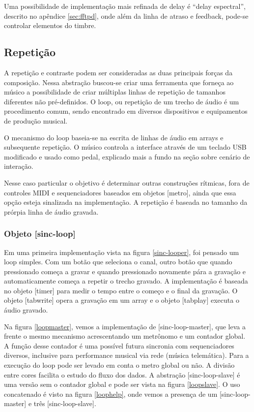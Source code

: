 \documentclass{ppgmus}
\begin{document}
Uma possibilidade de implementação mais refinada de delay é ``delay espectral'', descrito
no apêndice \ref{sec:fftpd}, onde além da linha de atraso e feedback, pode-se controlar elementos
do timbre.

\subsection{Repetição}


A repetição e contraste podem ser consideradas as duas principais forças
da composição. Nessa abstração buscou-se criar uma ferramenta que forneça ao músico 
a possibilidade de criar múltiplas linhas de repetição de tamanhos diferentes não pré-definidos.
O loop, ou repetição de um trecho de áudio é um procedimento comum,
sendo encontrado em diversos dispositivos e equipamentos de produção musical.


O mecanismo do loop baseia-se na escrita de linhas de áudio em arrays e subsequente
repetição. O músico controla a interface através de um teclado USB modificado e 
usado como pedal, explicado mais a fundo na seção sobre cenário de interação.

Nesse caso particular o objetivo é determinar outras construções rítmicas,
fora de controles MIDI e sequenciadores baseados em objetos [metro], ainda que essa opção
esteja sinalizada na implementação. A repetição
é baseada no tamanho da prórpia linha de áudio gravada.


\subsubsection{Objeto [sinc-loop]}


Em uma primeira implementação  vista na figura \ref{sinc-looper}, foi pensado um loop simples. Com um botão
que seleciona o canal, outro botão que quando pressionado começa 
a gravar e quando pressionado novamente pára a gravação e automaticamente
começa a repetir o trecho gravado. A implementação é baseada no objeto
[timer] para medir o tempo entre o começo e o final da gravação. O objeto
[tabwrite\texttildelow] opera a gravação em um array e o objeto [tabplay\texttildelow]
executa o áudio gravado.

Na figura \ref{loopmaster}, vemos a implementação de [sinc-loop-master], que leva a frente
o mesmo mecanismo acrescentando um metrônomo e um contador global. A função desse contador
é uma possível futura sincronia com sequenciadores diversos, inclusive para performance
musical via rede (música telemática). Para a execução do loop pode ser levado em conta
o metro global ou não. A divisão entre cores facilita o estudo do fluxo dos dados.
A abstração [sinc-loop-slave] é uma versão sem o contador global e pode ser vista
na figura \ref{loopslave}. O uso concatenado é visto na figura \ref{loophelp}, onde vemos
a presença de um [sinc-loop-master] e três [sinc-loop-slave].
\end{document}
